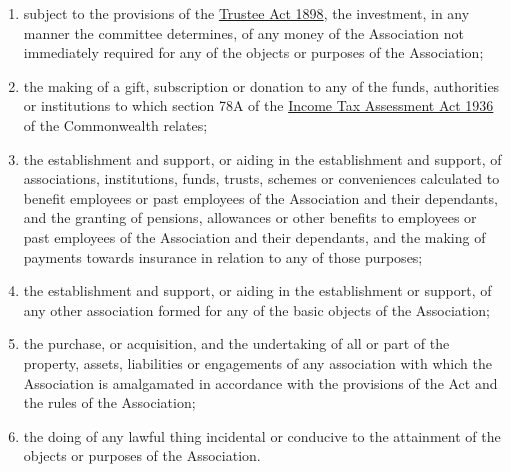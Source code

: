 \documentclass[a4paper,11pt]{article}
\begin{document}
\begin{enumerate}
	\item subject to the provisions of the \href{https://www.legislation.tas.gov.au/view/html/inforce/2019-05-06/act-1898-034}{Trustee Act 1898}, the investment, in any manner the committee determines, of any money of the Association not immediately required for any of the objects or purposes of the Association;
	\item the making of a gift, subscription or donation to any of the funds, authorities or institutions to which section 78A of the \href{https://www.legislation.gov.au/Series/C1936A00027}{Income Tax Assessment Act 1936} of the Commonwealth relates;
	\item the establishment and support, or aiding in the establishment and support, of associations, institutions, funds, trusts, schemes or conveniences calculated to benefit employees or past employees of the Association and their dependants, and the granting of pensions, allowances or other benefits to employees or past employees of the Association and their dependants, and the making of payments towards insurance in relation to any of those purposes;
	\item the establishment and support, or aiding in the establishment or support, of any other association formed for any of the basic objects of the Association;
	\item the purchase, or acquisition, and the undertaking of all or part of the property, assets, liabilities or engagements of any association with which the Association is amalgamated in accordance with the provisions of the Act and the rules of the Association;
	\item the doing of any lawful thing incidental or conducive to the attainment of the objects or purposes of the Association.
\end{enumerate}
\end{document}
